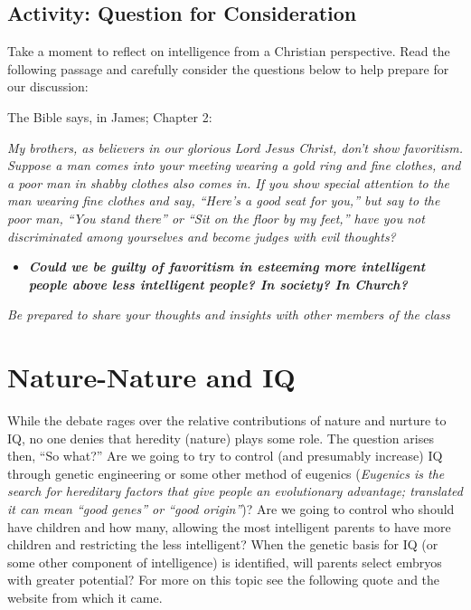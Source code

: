 \documentclass[
]{book}
\providecommand{\tightlist}{%
  \setlength{\itemsep}{0pt}\setlength{\parskip}{0pt}}
\begin{document}
\hypertarget{activity-question-for-consideration}{%
\subsection*{Activity: Question for Consideration}\label{activity-question-for-consideration}}

\begin{reflect}
Take a moment to reflect on intelligence from a Christian perspective. Read the following passage and carefully consider the questions below to help prepare for our discussion:

The Bible says, in James; Chapter 2:

\emph{My brothers, as believers in our glorious Lord Jesus Christ, don't show favoritism. Suppose a man comes into your meeting wearing a gold ring and fine clothes, and a poor man in shabby clothes also comes in. If you show special attention to the man wearing fine clothes and say, ``Here's a good seat for you,'' but say to the poor man, ``You stand there'' or ``Sit on the floor by my feet,'' have you not discriminated among yourselves and become judges with evil thoughts?}

\begin{itemize}
\tightlist
\item
  \textbf{\emph{Could we be guilty of favoritism in esteeming more intelligent people above less intelligent people? In society? In Church?}}
\end{itemize}

\emph{Be prepared to share your thoughts and insights with other members of the class}
\end{reflect}

\hypertarget{nature-nature-and-iq}{%
\section{Nature-Nature and IQ}\label{nature-nature-and-iq}}

While the debate rages over the relative contributions of nature and nurture to IQ, no one denies that heredity (nature) plays some role. The question arises then, ``So what?'' Are we going to try to control (and presumably increase) IQ through genetic engineering or some other method of eugenics (\emph{Eugenics is the search for hereditary factors that give people an evolutionary advantage; translated it can mean ``good genes'' or ``good origin''})? Are we going to control who should have children and how many, allowing the most intelligent parents to have more children and restricting the less intelligent? When the genetic basis for IQ (or some other component of intelligence) is identified, will parents select embryos with greater potential? For more on this topic see the following quote and the website from which it came.
\end{document}
